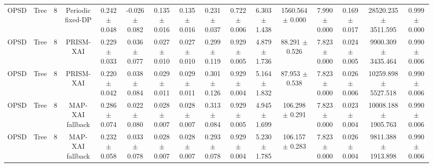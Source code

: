 \begin{tabular}{lccccccccccccccc}
OPSD & Tree & 8 & Periodic fixed-DP & 0.242 $\pm$ 0.048 & -0.026 $\pm$ 0.082 & 0.135 $\pm$ 0.016 & 0.135 $\pm$ 0.016 & 0.231 $\pm$ 0.037 & 0.722 $\pm$ 0.006 & 6.303 $\pm$ 1.438 & 1560.564 $\pm$ 0.000 & 7.990 $\pm$ 0.000 & 0.169 $\pm$ 0.017 & 28520.235 $\pm$ 3511.595 & 0.999 $\pm$ 0.000 \\
OPSD & Tree & 8 & PRISM-XAI & 0.229 $\pm$ 0.033 & 0.036 $\pm$ 0.077 & 0.027 $\pm$ 0.010 & 0.027 $\pm$ 0.010 & 0.299 $\pm$ 0.119 & 0.929 $\pm$ 0.005 & 4.879 $\pm$ 1.736 & 88.291 $\pm$ 0.526 & 7.823 $\pm$ 0.000 & 0.024 $\pm$ 0.005 & 9900.309 $\pm$ 3435.464 & 0.990 $\pm$ 0.006 \\
OPSD & Tree & 8 & PRISM-XAI & 0.220 $\pm$ 0.042 & 0.038 $\pm$ 0.084 & 0.029 $\pm$ 0.011 & 0.029 $\pm$ 0.011 & 0.301 $\pm$ 0.126 & 0.929 $\pm$ 0.004 & 5.164 $\pm$ 1.832 & 87.953 $\pm$ 0.538 & 7.823 $\pm$ 0.000 & 0.026 $\pm$ 0.006 & 10259.898 $\pm$ 5527.518 & 0.990 $\pm$ 0.006 \\
OPSD & Tree & 8 & MAP-XAI fallback & 0.286 $\pm$ 0.074 & 0.022 $\pm$ 0.080 & 0.028 $\pm$ 0.007 & 0.028 $\pm$ 0.007 & 0.313 $\pm$ 0.084 & 0.929 $\pm$ 0.005 & 4.945 $\pm$ 1.699 & 106.298 $\pm$ 0.291 & 7.823 $\pm$ 0.000 & 0.023 $\pm$ 0.004 & 10008.188 $\pm$ 1905.763 & 0.990 $\pm$ 0.006 \\
OPSD & Tree & 8 & MAP-XAI fallback & 0.232 $\pm$ 0.058 & 0.033 $\pm$ 0.078 & 0.028 $\pm$ 0.007 & 0.028 $\pm$ 0.007 & 0.293 $\pm$ 0.078 & 0.929 $\pm$ 0.004 & 5.230 $\pm$ 1.785 & 106.157 $\pm$ 0.283 & 7.823 $\pm$ 0.000 & 0.026 $\pm$ 0.004 & 9811.388 $\pm$ 1913.898 & 0.990 $\pm$ 0.006 \\
\bottomrule
\end{tabular}
